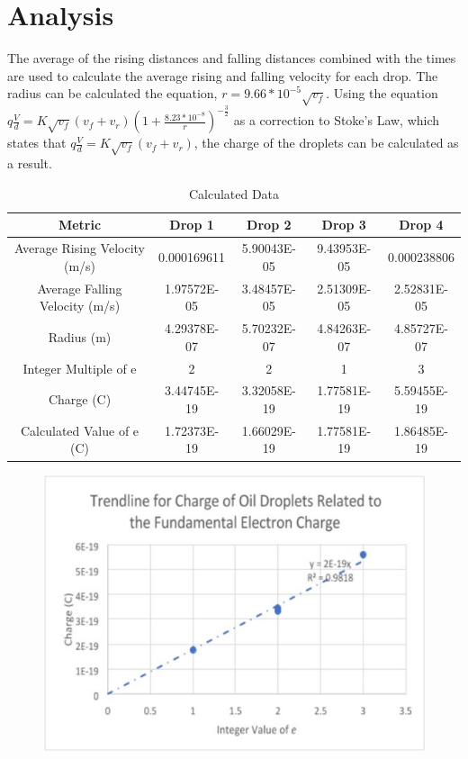 \documentclass[11pt]{article}
\begin{document}
\section{Analysis}

The average of the rising distances and falling distances combined with the times are used to calculate the average rising and falling velocity for each drop. The radius can be calculated the equation, $r = 9.66 * 10^{-5} \sqrt{v_f}$. Using the equation $q\frac{V}{d} = K\sqrt{v_f}(v_f + v_r)(1 + \frac{8.23 * 10^{-8}}{r})^{-\frac{3}{2}}$ as a correction to Stoke's Law, which states that $q\frac{V}{d} = K\sqrt{v_f}(v_f + v_r)$, the charge of the droplets can be calculated as a result.

\begin{table}[htp]
\begin{center}
\begin{tabular}{|c|c|c|c|c|}
\hline
Metric & Drop 1 & Drop 2 & Drop 3 & Drop 4 \\ \hline
Average Rising Velocity (m/s) & 0.000169611 & 5.90043E-05 & 9.43953E-05 & 0.000238806 \\
Average Falling Velocity (m/s) & 1.97572E-05 & 3.48457E-05 & 2.51309E-05 & 2.52831E-05 \\
Radius (m) & 4.29378E-07 & 5.70232E-07 & 4.84263E-07 & 4.85727E-07 \\
Integer Multiple of e & 2 & 2 & 1 & 3 \\
Charge (C) & 3.44745E-19 & 3.32058E-19 & 1.77581E-19 & 5.59455E-19 \\
Calculated Value of e (C) & 1.72373E-19 & 1.66029E-19 & 1.77581E-19 & 1.86485E-19 \\ \hline
\end{tabular}
\caption{Calculated Data}
\end{center}
\label{table2}
\end{table}

\begin{figure}[h]
\begin{center}
\includegraphics[scale=1]{PhysicsLab1.jpg}
\label{equip}
\end{center}
\end{figure}
\end{document}
